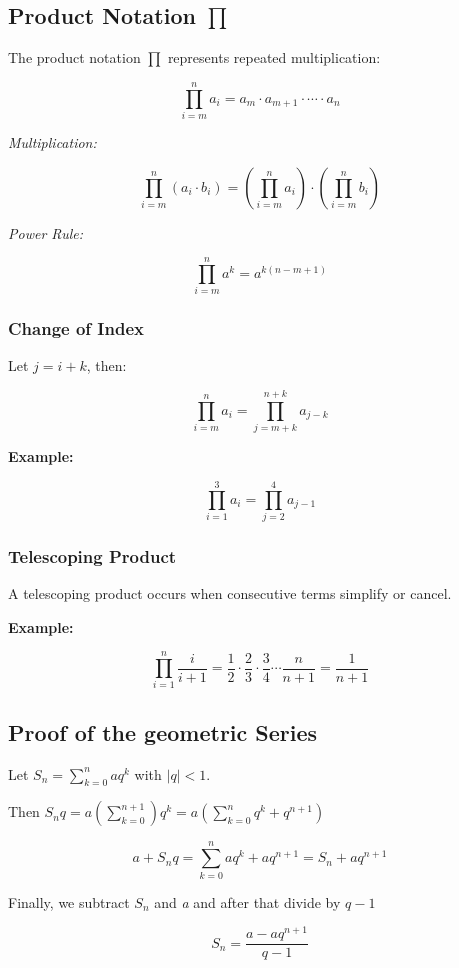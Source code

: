 \subsection{Product Notation \texorpdfstring{\(\prod\)}{∏}}

The product notation \(\prod\) represents repeated multiplication:

\[
    \prod_{i = m}^{n} a_i = a_m \cdot a_{m+1} \cdot \cdots \cdot a_n
\]

\emph{Multiplication:}
    
\[
    \prod_{i = m}^{n} (a_i \cdot b_i) = \left( \prod_{i = m}^{n} a_i \right) \cdot \left( 
    \prod_{i = m}^{n} b_i \right)
\]

\emph{Power Rule:}
    
\[
    \prod_{i = m}^{n} a^k = a^{k(n - m + 1)}
\]

\subsubsection{Change of Index}

Let \(j = i + k\), then:

\[
    \prod_{i = m}^{n} a_i = \prod_{j = m + k}^{n + k} a_{j - k}
\]

\textbf{Example:}

\[
    \prod_{i = 1}^{3} a_i = \prod_{j = 2}^{4} a_{j - 1}
\]

\subsubsection{Telescoping Product}

A telescoping product occurs when consecutive terms simplify or cancel.
\vspace{\baselineskip}

\textbf{Example:}

\[
    \prod_{i = 1}^{n} \frac{i}{i+1} = \frac{1}{2} \cdot \frac{2}{3} \cdot \frac{3}{4} \cdots 
    \frac{n}{n+1} = \frac{1}{n+1}
\]

\subsection{Proof of the geometric Series}

Let \(S_n = \sum_{k = 0}^{n}aq^k\) with \(|q| < 1\).
\vspace{\baselineskip}

Then \(S_n q = a(\sum_{k = 0}^{n + 1})q^k = a\left( \sum_{k= 0}^{n} q^k + q^{n + 1}\right)\)

\[
    a + S_n q = \sum_{k = 0}^{n}aq^k + aq^{n + 1}  = S_n + aq^{n + 1}
\]

Finally, we subtract \(S_n\) and \emph{a} and after that divide by \(q - 1\)

\[
    S_n = \frac{a - aq^{n + 1}}{q - 1}
\]

\QED